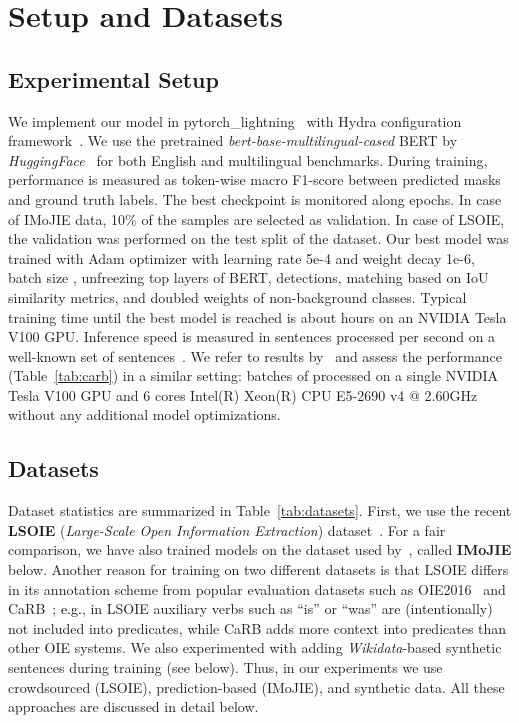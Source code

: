 \documentclass[letterpaper]{article} \usepackage{aaai22}  \usepackage{times}  \usepackage{helvet}  \usepackage{courier}  \usepackage[hyphens]{url}  \usepackage{graphicx} \usepackage{placeins}
\newcommand{\camera}[1]{\textcolor{black}{#1}}
\begin{document}
\section{Setup and Datasets}\label{sec:experimental_setup}
\subsection{Experimental Setup}

We implement our model in pytorch\_lightning~\cite{falcon2019pytorch} with Hydra configuration framework~\cite{Yadan2019Hydra}. We use the pretrained \emph{bert-base-multilingual-cased} BERT by \emph{HuggingFace}~\cite{wolf-etal-2020-transformers} for both English and multilingual benchmarks.
During training, performance is measured as token-wise macro F1-score between predicted masks and ground truth labels. The best checkpoint is monitored along epochs. In case of IMoJIE data, 10\% of the samples are selected as validation. In case of LSOIE, the validation was performed on the test split of the dataset.
Our best model was trained with Adam optimizer with learning rate 5e-4 and weight decay 1e-6, batch size , unfreezing  top layers of BERT,  detections, matching based on IoU similarity metrics, 
and doubled weights of non-background classes.
 Typical training time until the best model is reached is about  hours on an NVIDIA Tesla V100 GPU.
Inference speed is measured in sentences processed per second on a well-known set of  sentences~\cite{stanovsky-etal-2018-supervised}. We refer to results by~\citet{kolluru2020openie6} and assess the performance (Table~\ref{tab:carb}) in a similar setting: batches of  processed on a single NVIDIA Tesla V100 GPU and 6 cores Intel(R) Xeon(R) CPU E5-2690 v4 @ 2.60GHz without any additional model optimizations.

\subsection{Datasets}\label{ssec:data}

Dataset statistics are summarized in Table~\ref{tab:datasets}.
First, we use the recent \textbf{LSOIE} (\emph{Large-Scale Open Information Extraction}) dataset~\cite{lsoie-2021}.
For a fair comparison, we have also trained models on the dataset used by~\citet{kolluru2020openie6,kolluru2020imojie}, called \textbf{IMoJIE} below. 
Another reason for training on two different datasets is that LSOIE
differs in its annotation scheme from 
popular evaluation datasets such as OIE2016~\cite{Stanovsky2016EMNLP} and CaRB~\cite{bhardwaj-etal-2019-carb};
\camera{e.g.}, in LSOIE auxiliary verbs such as ``is'' or ``was'' are (intentionally) not included into predicates, while CaRB adds more context into predicates than other OIE systems.
We also experimented with adding \emph{Wikidata}-based synthetic sentences during training (see below).
Thus, in our experiments we use crowdsourced (LSOIE), prediction-based (IMoJIE), and synthetic data. All these approaches are discussed in detail below.
\end{document}
